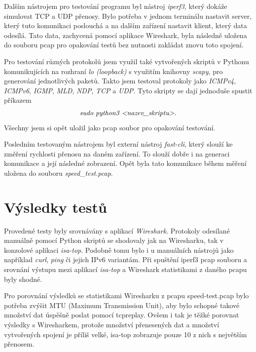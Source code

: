 \documentclass[a4paper, 11pt, hidelinks]{article}
\begin{document}
Dalším nástrojem pro testování programu byl nástroj \emph{iperf3}, který dokáže simulovat TCP a UDP přenosy. Bylo potřeba v jednom terminálu nastavit server, který tuto komunikaci poslouchá a na dalším zařízení nastavit klient, který data odesílá. Tato data, zachycená pomocí aplikace Wireshark, byla následně uložena do souboru pcap pro opakování testů bez nutnosti zakládat znovu toto spojení.

Pro testování různých protokolů jsem využil také vytvořených skriptů v Pythonu komunikujících na rozhraní \emph{lo (loopback)} s využitím knihovny \emph{scapy}, pro generování jednotlivých paketů. Takto jsem testoval protokoly jako \emph{ICMPv4}, \emph{ICMPv6}, \emph{IGMP}, \emph{MLD}, \emph{NDP}, \emph{TCP} a \emph{UDP}. Tyto skripty se dají jednoduše spustit příkazem $$\emph{sudo python3 <nazev\_skriptu>}.$$ Všechny jsem si opět uložil jako pcap soubor pro opakování testování.

Posledním testovaným nástrojem byl externí nástroj \emph{fast-cli}, který slouží ke změření rychlosti přenosu na daném zařízení. To slouží dobře i na generaci komunikace a její následné zobrazení. Opět byla tato komunikace během měření uložena do souboru \emph{speed\_test.pcap}. 
\newpage
\section{Výsledky testů}
Provedené testy byly srovnávány s aplikací \emph{Wireshark}. Protokoly odesílané manuálně pomocí Python skriptů se shodovaly jak na Wiresharku, tak v konzolové aplikaci \emph{isa-top}. Podobně tomu bylo i u manuálních nástrojů jako například \emph{curl}, \emph{ping} či jejich IPv6 variantám. Při spuštění iperf3 pcap souboru a srovnání výstupu mezi aplikací \emph{isa-top} a Wireshark statistikami z daného pcapu byly shodné.

Pro porovnání výsledků se statistikami Wiresharku z pcapu speed-test.pcap bylo potřeba zvýšit MTU (Maximum Transmission Unit), aby bylo schopné takové množství dat úspěšně poslat pomocí tcpreplay. Ovšem i tak je těžké porovnat výsledky s Wiresharkem, protože množství přenesených dat a množství vytvořených spojení je příliš velké, isa-top zobrazuje pouze 10 z nich s největším přenosem.

\newpage


\end{document}
